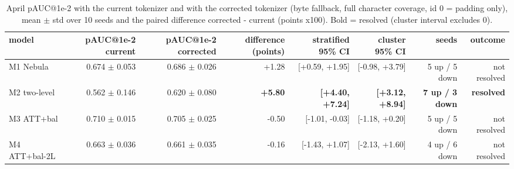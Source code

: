 \begin{table}[t]
\centering
\small
\caption{April pAUC@1e-2 with the current tokenizer and with the corrected tokenizer (byte fallback, full character coverage, id 0 = padding only), mean $\pm$ std over 10 seeds and the paired difference corrected - current (points x100). Bold = resolved (cluster interval excludes 0).}
\label{tab:T8_current_vs_corrected_tokenizer}
\begin{tabular}{lrrrrrrr}
\toprule
model & pAUC@1e-2 current & pAUC@1e-2 corrected & difference (points) & stratified 95\% CI & cluster 95\% CI & seeds & outcome \\
\midrule
M1 Nebula & 0.674 $\pm$ 0.053 & 0.686 $\pm$ 0.026 & +1.28 & [+0.59, +1.95] & [-0.98, +3.79] & 5 up / 5 down & not resolved \\
M2 two-level & 0.562 $\pm$ 0.146 & 0.620 $\pm$ 0.080 & \textbf{+5.80} & \textbf{[+4.40, +7.24]} & \textbf{[+3.12, +8.94]} & \textbf{7 up / 3 down} & \textbf{resolved} \\
M3 ATT+bal & 0.710 $\pm$ 0.015 & 0.705 $\pm$ 0.025 & -0.50 & [-1.01, -0.03] & [-1.18, +0.20] & 5 up / 5 down & not resolved \\
M4 ATT+bal-2L & 0.663 $\pm$ 0.036 & 0.661 $\pm$ 0.035 & -0.16 & [-1.43, +1.07] & [-2.13, +1.60] & 4 up / 6 down & not resolved \\
\bottomrule
\end{tabular}
\end{table}
